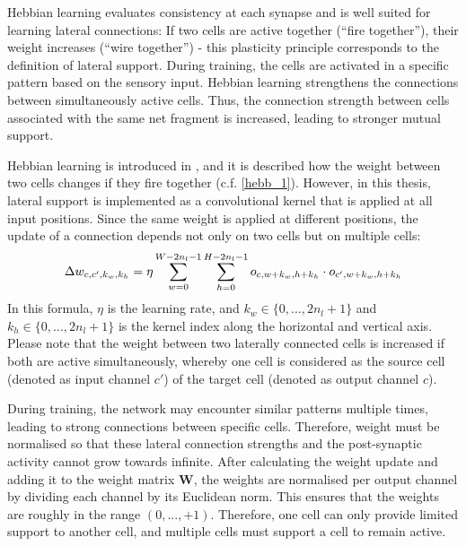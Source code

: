 Hebbian learning evaluates consistency at each synapse and is well suited for learning lateral connections: If two cells are active together (``fire together''), their weight increases (``wire together'') - this plasticity principle corresponds to the definition of lateral support. During training, the cells are activated in a specific pattern based on the sensory input. Hebbian learning strengthens the connections between simultaneously active cells. Thus, the connection strength between cells associated with the same net fragment is increased, leading to stronger mutual support.

Hebbian learning is introduced in , and it is described how the weight between two cells changes if they fire together (c.f. \eqref{hebb_1}).
However, in this thesis, lateral support is implemented as a convolutional kernel that is applied at all input positions.
Since the same weight is applied at different positions, the update of a connection depends not only on two cells but on multiple cells:
%
\begin{align}\eqlbl{hebbu_1}
	\Delta w_{c, c',k_w,k_h} = \eta \sum_{w = 0}^{W - 2n_l - 1} \sum_{h = 0}^{H - 2n_l - 1} o_{c,w+k_w,h+k_h} \cdot o_{c',w+k_w,h+k_h}
\end{align}
%
In this formula, $\eta$ is the learning rate, and $k_w \in \{0, ..., 2n_l+1\}$ and $k_h\in \{0, ..., 2n_l+1 \}$ is the kernel index along the horizontal and vertical axis.
Please note that the weight between two laterally connected cells is increased if both are active simultaneously, whereby one cell is considered as the source cell (denoted as input channel $c'$) of the target cell (denoted as output channel $c$).

During training, the network may encounter similar patterns multiple times, leading to strong connections between specific cells. Therefore, weight must be normalised so that these lateral connection strengths and the post-synaptic activity cannot grow towards infinite. After calculating the weight update and adding it to the weight matrix $\boldsymbol{W}$, the weights are normalised per output channel by dividing each channel by its Euclidean norm. This ensures that the weights are roughly in the range $(0, ..., +1)$.
Therefore, one cell can only provide limited support to another cell, and multiple cells must support a cell to remain active.


